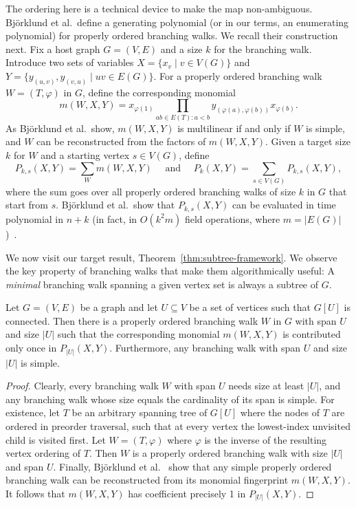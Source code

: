 \documentclass{theoretics}
\begin{document}
The ordering here is a technical device to make the map non-ambiguous.
Björklund et al.\ define a generating polynomial (or in our terms,
an enumerating polynomial) for properly ordered branching walks.
We recall their construction next.
Fix a host graph $G=(V,E)$ and a size $k$ for the branching walk.
Introduce two sets of variables $X=\{x_v \mid v \in V(G)\}$
and $Y=\{y_{(u,v)}, y_{(v,u)} \mid uv \in E(G)\}$.
For a properly ordered branching walk $W = (T, \varphi)$ in $G$, define the
corresponding monomial
\[
  m(W,X,Y) = x_{\varphi(1)} \prod_{ab \in E(T): a<b} y_{(\varphi(a),\varphi(b))} x_{\varphi(b)}.
\]
As Björklund et al.\ show, $m(W,X,Y)$ is multilinear if and only if
$W$ is simple, and $W$ can be reconstructed from the factors of $m(W,X,Y)$. 
Given a target size $k$ for $W$ and a starting vertex $s \in V(G)$, define
\[
  P_{k,s}(X,Y) = \sum_W m(W,X,Y) \quad \text{ and } \quad P_k(X,Y) = \sum_{s \in V(G)} P_{k,s}(X,Y),
\]
where the sum goes over all properly ordered branching walks of size
$k$ in $G$ that start from $s$. Björklund et al.\ show that $P_{k,s}(X,Y)$
can be evaluated in time polynomial in $n+k$ (in fact, in $O(k^2 m)$ field operations,
where $m=|E(G)|$)~\cite{BjorklundKK16}. 

We now visit our target result, Theorem~\ref{thm:subtree-framework}.
We observe the key property of branching walks that make them
algorithmically useful: A \emph{minimal}
branching walk spanning a given vertex set is always a subtree of $G$.

\begin{lemma} \label{lemma:branching-walks-simple}
  Let $G=(V,E)$ be a graph and let $U \subseteq V$ be a set of vertices such that $G[U]$ is connected.
  Then there is a properly ordered branching walk $W$ in $G$ with span $U$
  and size $|U|$ such that the corresponding monomial $m(W,X,Y)$ is contributed only once in $P_{|U|}(X,Y)$.
  Furthermore, any branching walk with span $U$ and size $|U|$ is simple.
\end{lemma}
\begin{proof}
  Clearly, every branching walk $W$ with span $U$ needs size at least $|U|$,
  and any branching walk whose size equals the cardinality of its span is simple.
  For existence, let $T$ be an arbitrary spanning tree of $G[U]$
  where the nodes of $T$ are ordered in preorder traversal, such
  that at every vertex the lowest-index unvisited child is visited
  first. Let $W=(T,\varphi)$ where $\varphi$ is the inverse of the
  resulting vertex ordering of $T$. Then $W$ is a properly ordered
  branching walk with size $|U|$ and span $U$. Finally,
  Björklund et al.~\cite{BjorklundKK16} show that any simple properly
  ordered branching walk can be reconstructed from its monomial
  fingerprint $m(W,X,Y)$. It follows that $m(W,X,Y)$ has coefficient
  precisely 1 in $P_{|U|}(X,Y)$. 
\end{proof}
\end{document}
